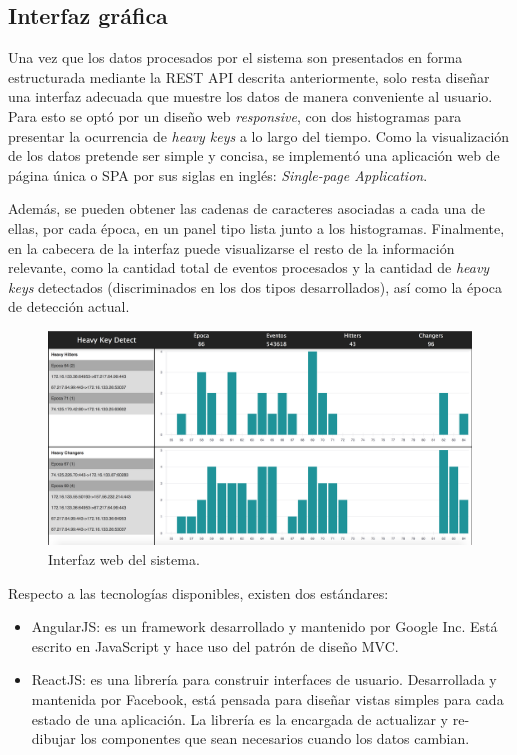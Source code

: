 \documentclass[a4paper,10pt, oneside]{article}
\begin{document}
\subsection{Interfaz gráfica}

Una vez que los datos procesados por el sistema son presentados en forma estructurada mediante la REST API descrita anteriormente, solo resta diseñar una interfaz adecuada que muestre los datos de manera conveniente al usuario. Para esto se optó por un diseño web \textit{responsive}, con dos histogramas para presentar la ocurrencia de \textit{heavy keys} a lo largo del tiempo. Como la visualización de los datos pretende ser simple y concisa, se implementó una aplicación web de página única o SPA por sus siglas en inglés: \textit{Single-page Application}.

Además, se pueden obtener las cadenas de caracteres asociadas a cada una de ellas, por cada época, en un panel tipo lista junto a los histogramas. Finalmente, en la cabecera de la interfaz puede visualizarse el resto de la información relevante, como la cantidad total de eventos procesados y la cantidad de \textit{heavy keys} detectados (discriminados en los dos tipos desarrollados), así como la época de detección actual.

\begin{figure}[h]
	\centering
	\includegraphics[width=1\textwidth]{./graph/ui.png}
	\caption{Interfaz web del sistema.}
	\label{diag:ui}
\end{figure}

Respecto a las tecnologías disponibles, existen dos estándares:
\begin{itemize}
	\item AngularJS: es un framework desarrollado y mantenido por Google Inc. Está escrito en JavaScript y hace uso del patrón de diseño MVC.
	\item ReactJS: es una librería para construir interfaces de usuario. Desarrollada y mantenida por Facebook, está pensada para diseñar vistas simples para cada estado de una aplicación. La librería es la encargada de actualizar y re-dibujar los componentes que sean necesarios cuando los datos cambian.
\end{itemize}
\end{document}
